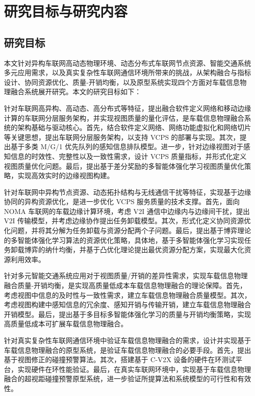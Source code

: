 \section{研究目标与研究内容}\label{section 1-4}

\subsection{研究目标}

本文针对异构车联网高动态物理环境、动态分布式车联网节点资源、智能交通系统多元应用需求，以及真实复杂性车联网通信环境所带来的挑战，从架构融合与指标设计、协同资源优化、质量-开销均衡，以及原型系统实现四个方面对车载信息物理融合系统展开研究。本文的研究目标如下：

 针对车联网高异构、高动态、高分布式等特征，提出融合软件定义网络和移动边缘计算的车联网分层服务架构，并实现视图质量的量化评估，是车载信息物理融合系统的架构基础与驱动核心。首先，结合软件定义网络、网络功能虚拟化和网络切片等关键思想，提出车联网分层服务架构，以支持 VCPS 的部署与实现。其次，提出基于多类 M/G/1 优先队列的感知信息排队模型。进一步，针对边缘视图对于感知信息的时效性、完整性以及一致性需求，设计 VCPS 质量指标，并形式化定义视图质量优化问题。最后，提出基于差分奖励的多智能体强化学习视图质量优化策略，实现高效实时的边缘视图构建。

 针对车联网中异构节点资源、动态拓扑结构与无线通信干扰等特征，实现基于边缘协同的异构资源优化，是进一步优化 VCPS 服务质量的技术支撑。首先，面向 NOMA 车联网的车载边缘计算环境，考虑 V2I 通信中边缘内与边缘间干扰，提出 V2I 传输模型，并考虑边缘协作提出任务卸载模型。其次，形式化定义协同资源优化问题，并将其分解为任务卸载与资源分配两个子问题。最后，提出基于博弈理论的多智能体强化学习算法的资源优化策略，具体地，基于多智能体强化学习实现任务卸载博弈的纳什均衡，并基于凸优化理论提出最优资源分配方案，实现最大化资源利用效率。

 针对多元智能交通系统应用对于视图质量/开销的差异性需求，实现车载信息物理融合质量-开销均衡，是实现高质量低成本车载信息物理融合的理论保障。首先，考虑视图中信息的及时性与一致性需求，建立车载信息物理融合质量模型。其次，考虑视图构建中感知信息的冗余度、感知开销与传输开销，建立车载信息物理融合开销模型。最后，提出基于多目标多智能体强化学习的质量与开销均衡策略，实现高质量低成本可扩展车载信息物理融合。

 针对真实复杂性车联网通信环境中验证车载信息物理融合的需求，设计并实现基于车载信息物理融合的原型系统，是验证车载信息物理融合的必要手段。首先，提出基于视图修正的碰撞预警算法。其次，搭建基于 C-V2X 设备的硬件在环测试平台，实现硬件在环性能验证。最后，在真实车联网环境中，实现基于车载信息物理融合的超视距碰撞预警原型系统，进一步验证所提算法和系统模型的可行性和有效性。

